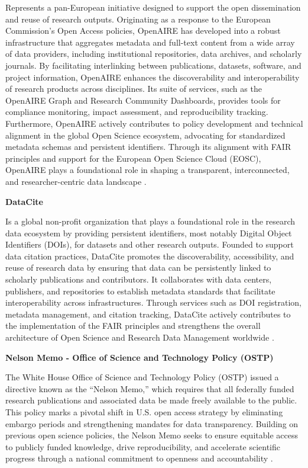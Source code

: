 \documentclass[final]{rc-book-2.14}
\begin{document}
Represents a pan-European initiative designed to support the open dissemination and reuse of research outputs. Originating as a response to the European Commission's Open Access policies, OpenAIRE has developed into a robust infrastructure that aggregates metadata and full-text content from a wide array of data providers, including institutional repositories, data archives, and scholarly journals. By facilitating interlinking between publications, datasets, software, and project information, OpenAIRE enhances the discoverability and interoperability of research products across disciplines. Its suite of services, such as the OpenAIRE Graph and Research Community Dashboards, provides tools for compliance monitoring, impact assessment, and reproducibility tracking. Furthermore, OpenAIRE actively contributes to policy development and technical alignment in the global Open Science ecosystem, advocating for standardized metadata schemas and persistent identifiers. Through its alignment with FAIR principles and support for the European Open Science Cloud (EOSC), OpenAIRE plays a foundational role in shaping a transparent, interconnected, and researcher-centric data landscape \cite{rettberg_openaire_2012}.

\textbf{DataCite}

Is a global non-profit organization that plays a foundational role in the research data ecosystem by providing persistent identifiers, most notably Digital Object Identifiers (DOIs), for datasets and other research outputs. Founded to support data citation practices, DataCite promotes the discoverability, accessibility, and reuse of research data by ensuring that data can be persistently linked to scholarly publications and contributors. It collaborates with data centers, publishers, and repositories to establish metadata standards that facilitate interoperability across infrastructures. Through services such as DOI registration, metadata management, and citation tracking, DataCite actively contributes to the implementation of the FAIR principles and strengthens the overall architecture of Open Science and Research Data Management worldwide \cite{brase_datacite_2009}.

\textbf{Nelson Memo - Office of Science and Technology Policy (OSTP)}

The White House Office of Science and Technology Policy (OSTP) issued a directive known as the “Nelson Memo,” which requires that all federally funded research publications and associated data be made freely available to the public. This policy marks a pivotal shift in U.S. open access strategy by eliminating embargo periods and strengthening mandates for data transparency. Building on previous open science policies, the Nelson Memo seeks to ensure equitable access to publicly funded knowledge, drive reproducibility, and accelerate scientific progress through a national commitment to openness and accountability \cite{nelson_2023}.
\end{document}
